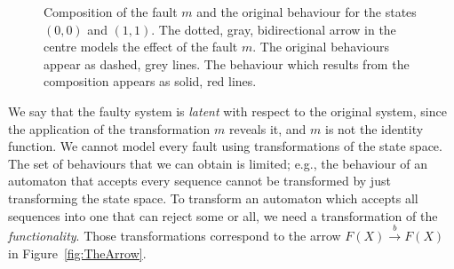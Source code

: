 \begin{figure}[t]
    \centering
    \caption{Composition of the fault $m$ and the original behaviour for the states $(0,0)$ and $(1,1)$. The dotted, gray, bidirectional arrow in the centre models the effect of the fault $m$. The original behaviours appear as dashed, grey lines. The behaviour which results from the composition appears as solid, red lines.}
    \label{fig:ExampleWithFaults}
\end{figure}
We say that the faulty system is \emph{latent} with respect to the original system, since the application of the transformation $m$ reveals it, and $m$ is not the identity function. 
We cannot model every fault using transformations of the state space. The set of behaviours that we can obtain is limited; e.g., the behaviour of an automaton that accepts every sequence cannot be transformed by just transforming the state space. 
To transform an automaton which accepts all sequences into one that can reject some or all, we need a transformation of the \emph{functionality}. 
Those transformations correspond to the arrow $F(X)\xrightarrow{b}F(X)$ in Figure~\ref{fig:TheArrow}. 

